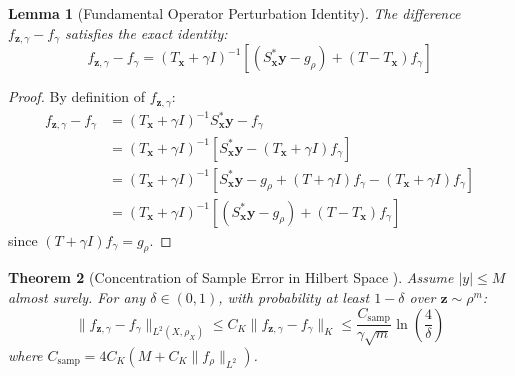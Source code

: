 \documentclass[11pt,a4paper]{article}
\newtheorem{theorem}{Theorem}[section]
\newtheorem{lemma}[theorem]{Lemma}
\theoremstyle{definition}
\begin{document}
\begin{lemma}[Fundamental Operator Perturbation Identity]\label{lem:operator_perturbation}
The difference $f_{\mathbf{z}, \gamma} - f_\gamma$ satisfies the exact identity:
\begin{equation}\label{eq:perturbation_identity}
f_{\mathbf{z}, \gamma} - f_\gamma = (T_{\mathbf{x}} + \gamma I)^{-1} \left[ (S_{\mathbf{x}}^* \mathbf{y} - g_\rho) + (T - T_{\mathbf{x}}) f_\gamma \right]
\end{equation}
\end{lemma}

\begin{proof}
By definition of $f_{\mathbf{z}, \gamma}$:
\begin{align*}
f_{\mathbf{z}, \gamma} - f_\gamma &= (T_{\mathbf{x}} + \gamma I)^{-1} S_{\mathbf{x}}^* \mathbf{y} - f_\gamma \\
&= (T_{\mathbf{x}} + \gamma I)^{-1} \left[ S_{\mathbf{x}}^* \mathbf{y} - (T_{\mathbf{x}} + \gamma I) f_\gamma \right] \\
&= (T_{\mathbf{x}} + \gamma I)^{-1} \left[ S_{\mathbf{x}}^* \mathbf{y} - g_\rho + (T + \gamma I) f_\gamma - (T_{\mathbf{x}} + \gamma I) f_\gamma \right] \\
&= (T_{\mathbf{x}} + \gamma I)^{-1} \left[ (S_{\mathbf{x}}^* \mathbf{y} - g_\rho) + (T - T_{\mathbf{x}}) f_\gamma \right]
\end{align*}
since $(T + \gamma I) f_\gamma = g_\rho$.
\end{proof}

\begin{theorem}[Concentration of Sample Error in Hilbert Space \cite{caponnetto2007}]\label{thm:sample_error}
Assume $|y| \le M$ almost surely. For any $\delta \in (0, 1)$, with probability at least $1 - \delta$ over $\mathbf{z} \sim \rho^m$:
\begin{equation}\label{eq:sample_error_bound}
\|f_{\mathbf{z}, \gamma} - f_\gamma\|_{L^2(X, \rho_X)} \le C_K \|f_{\mathbf{z}, \gamma} - f_\gamma\|_K \le \frac{C_{\text{samp}}}{\gamma \sqrt{m}} \ln\left(\frac{4}{\delta}\right)
\end{equation}
where $C_{\text{samp}} = 4 C_K (M + C_K \|f_\rho\|_{L^2})$.
\end{theorem}
\end{document}
